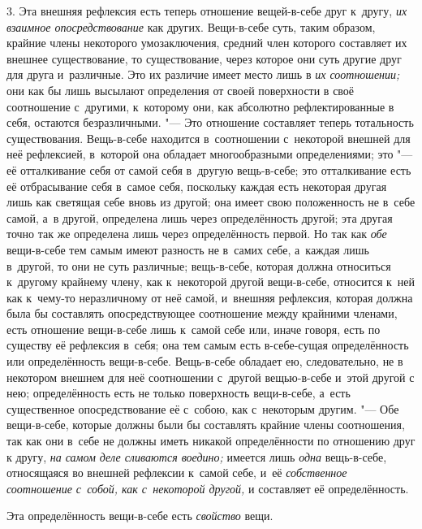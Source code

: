 3. Эта внешняя рефлексия есть теперь отношение вещей-в-себе друг к~другу,
{\em их взаимное опосредствование} как других.
Вещи-в-себе суть, таким образом, крайние члены некоторого умозаключения,
средний член которого составляет их внешнее существование, то
существование, через которое они суть другие друг для друга и~различные.
Это их различие имеет место лишь в {\em их соотношении;} они как бы
лишь высылают определения от своей поверхности в
своё соотношение с~другими, к~которому они, как абсолютно рефлектированные
в себя, остаются безразличными. "--- Это отношение составляет теперь
тотальность существования. Вещь-в-себе находится в~соотношении с~некоторой
внешней для неё рефлексией, в~которой она обладает многообразными
определениями; это "--- её отталкивание себя от самой себя в~другую вещь-в-себе;
это отталкивание есть её отбрасывание себя в~самое себя, поскольку каждая
есть некоторая другая лишь как светящая себе вновь из другой; она имеет
свою положенность не в~себе самой, а~в другой, определена лишь через
определённость другой; эта другая точно так же определена лишь через
определённость первой. Но так как {\em обе} вещи-в-себе
тем самым имеют разность не в~самих себе, а~каждая лишь в~другой, то они не
суть различные; вещь-в-себе, которая должна относиться к~другому крайнему
члену, как к~некоторой другой вещи-в-себе, относится к~ней как к~чему-то
неразличному от неё самой, и~внешняя рефлексия, которая должна была бы
составлять опосредствующее соотношение между крайними членами, есть
отношение вещи-в-себе лишь к~самой себе или, иначе говоря, есть по существу
её рефлексия в~себя; она тем самым есть в-себе-сущая определённость или
определённость вещи-в-себе. Вещь-в-себе обладает ею, следовательно, не в
некотором внешнем для неё соотношении с~другой вещью-в-себе и~этой другой с
нею; определённость есть не только поверхность вещи-в-себе, а~есть
существенное опосредствование её с~собою, как с~некоторым другим. "--- Обе
вещи-в-себе, которые должны были бы составлять крайние члены соотношения,
так как они в~себе не должны иметь никакой определённости по отношению друг
к другу, {\em на самом деле сливаются воедино;} имеется лишь {\em одна}
вещь-в-себе, относящаяся во внешней рефлексии к~самой себе, и~её
{\em собственное соотношение с~собой, как с~некоторой другой,}
и составляет её определённость.

Эта определённость вещи-в-себе есть {\em свойство} вещи.



